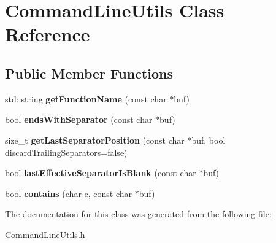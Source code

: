 \hypertarget{class_command_line_utils}{
\section{CommandLineUtils Class Reference}
\label{class_command_line_utils}
}
\subsection*{Public Member Functions}
\begin{DoxyCompactItemize}
\item 
\hypertarget{class_command_line_utils_acee686f400e59c119e060f62aa4f4f30}{
std::string {\bfseries getFunctionName} (const char $\ast$buf)}
\label{class_command_line_utils_acee686f400e59c119e060f62aa4f4f30}

\item 
\hypertarget{class_command_line_utils_a2a2d1c9e62fdb0879a69244d9a40e17d}{
bool {\bfseries endsWithSeparator} (const char $\ast$buf)}
\label{class_command_line_utils_a2a2d1c9e62fdb0879a69244d9a40e17d}

\item 
\hypertarget{class_command_line_utils_a195bd02e42897954aaeaa3aad631a432}{
size\_\-t {\bfseries getLastSeparatorPosition} (const char $\ast$buf, bool discardTrailingSeparators=false)}
\label{class_command_line_utils_a195bd02e42897954aaeaa3aad631a432}

\item 
\hypertarget{class_command_line_utils_aea62a85f21d00109f336361dddaf99ab}{
bool {\bfseries lastEffectiveSeparatorIsBlank} (const char $\ast$buf)}
\label{class_command_line_utils_aea62a85f21d00109f336361dddaf99ab}

\item 
\hypertarget{class_command_line_utils_a53a1f2f7895927be53d723218ed11fbf}{
bool {\bfseries contains} (char c, const char $\ast$buf)}
\label{class_command_line_utils_a53a1f2f7895927be53d723218ed11fbf}

\end{DoxyCompactItemize}


The documentation for this class was generated from the following file:\begin{DoxyCompactItemize}
\item 
CommandLineUtils.h\end{DoxyCompactItemize}
